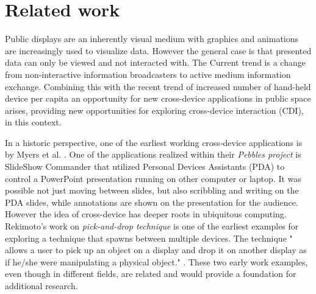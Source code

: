 \section{Related work} \label{sec:relatedwork}

Public displays are an inherently visual medium with graphics and animations are increasingly used to visualize data. However the general case is that presented data can only be viewed and not interacted with. The Current trend is a change from non-interactive information broadcasters to active medium information exchange. Combining this with the recent trend of increased number of hand-held device per capita an opportunity for new cross-device applications in public space arises, providing new opportunities for exploring cross-device interaction (CDI), in this context.

In a historic perspective, one of the earliest working cross-device applications is by Myers et al. \cite{Myers:2001}. 
One of the applications realized within their \emph{Pebbles project} is SlideShow Commander that utilized Personal Devices Assistants (PDA) to control a PowerPoint presentation running on other computer or laptop.
It was possible not just moving between slides, but also scribbling and writing on the PDA slides, while annotations are shown on the presentation for the audience. 
However the idea of cross-device has deeper roots in ubiquitous computing. Rekimoto's work on \emph{pick-and-drop technique} is one of the earliest examples for exploring a technique that spawns between multiple devices. The technique " allows a user to pick up an object on a display and drop it on another display as if he/she were manipulating a physical object." \cite{Rekimoto:1997}. 
These two early work examples, even though in different fields, are related and would provide a foundation for additional research.\\

